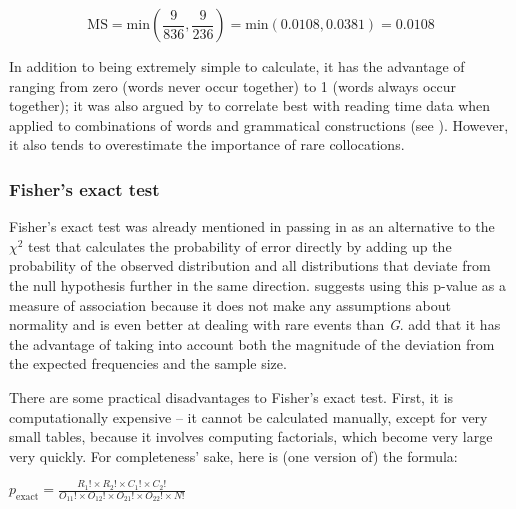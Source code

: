 \[\text{MS} = \text{min} \left( \frac{9}{836}, \frac{9}{236} \right) = \text{min} \left( 0.0108,0.0381 \right) = 0.0108\]

In addition to being extremely simple to calculate, it has the advantage of ranging from zero (words never occur together) to 1 (words always occur together); it was also argued by \citet{wiechmann_computation_2008} to correlate  best with reading time data when applied to combinations of words and grammatical constructions (see ). However, it also tends to overestimate the importance of rare  collocations.

\subsubsection{Fisher's exact test}
\label{sec:amfishersexacttest}

Fisher's exact test  was already mentioned in passing in  as an alternative to the $\chi^2$  test that calculates the probability  of error directly by adding up the probability of the observed distribution  and all distributions that deviate from the null hypothesis  further in the same direction. \citet{pedersen_fishing_1996} suggests using this p\hyp{}value as a measure of association  because it does not make any assumptions about normality and is even better at dealing with rare events than \emph{G}.  \citet[238--239]{stefanowitsch_collostructions:_2003} add that it has the advantage of taking into account both the magnitude of the deviation from the expected  frequencies and the sample  size.

There are some practical disadvantages to Fisher's exact test.  First, it is computationally expensive -- it cannot be calculated manually, except for very small tables, because it involves computing factorials, which become very large very quickly. For completeness' sake, here is (one version of) the formula:

\begin{exe}
\ex $\displaystyle{p_\text{exact} = \frac{R_1! \times R_2! \times C_1! \times C_2!}{O_{11}! \times O_{12}! \times O_{21}! \times O_{22}! \times N!}}$
\label{ex:fisherexaxt}
\end{exe}

